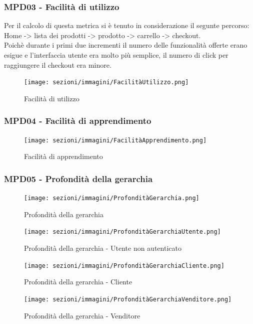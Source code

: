 \subsubsection{MPD03 - Facilità di utilizzo}
Per il calcolo di questa metrica si è tenuto in considerazione il segunte percorso:\\
Home -> lista dei prodotti -> prodotto -> carrello -> checkout.\\
Poichè durante i primi due incrementi il numero delle funzionalità offerte erano esigue e l'interfaccia utente era molto più semplice,
il numero di click per raggiungere il checkout era minore.
\begin{figure}[!ht]
    \caption{Facilità di utilizzo}
    \vspace{10px}
    \texttt{[image: sezioni/immagini/FacilitàUtilizzo.png]}
    \centering
\end{figure}
\pagebreak
\subsubsection{MPD04 - Facilità di apprendimento}
\begin{figure}[!ht]
    \caption{Facilità di apprendimento}
    \vspace{10px}
    \texttt{[image: sezioni/immagini/FacilitàApprendimento.png]}
    \centering
\end{figure}
\subsubsection{MPD05 - Profondità della gerarchia}
\begin{figure}[!ht]
    \caption{Profondità della gerarchia}
    \vspace{10px}
    \texttt{[image: sezioni/immagini/ProfonditàGerarchia.png]}
    \centering
\end{figure}
\pagebreak
\begin{figure}[!ht]
    \caption{Profondità della gerarchia - Utente non autenticato}
    \vspace{10px}
    \texttt{[image: sezioni/immagini/ProfonditàGerarchiaUtente.png]}
    \centering
\end{figure}
\begin{figure}[!ht]
    \caption{Profondità della gerarchia - Cliente}
    \vspace{10px}
    \texttt{[image: sezioni/immagini/ProfonditàGerarchiaCliente.png]}
    \centering
\end{figure}
\pagebreak
\begin{figure}[!ht]
    \caption{Profondità della gerarchia - Venditore}
    \vspace{10px}
    \texttt{[image: sezioni/immagini/ProfonditàGerarchiaVenditore.png]}
    \centering
\end{figure}

